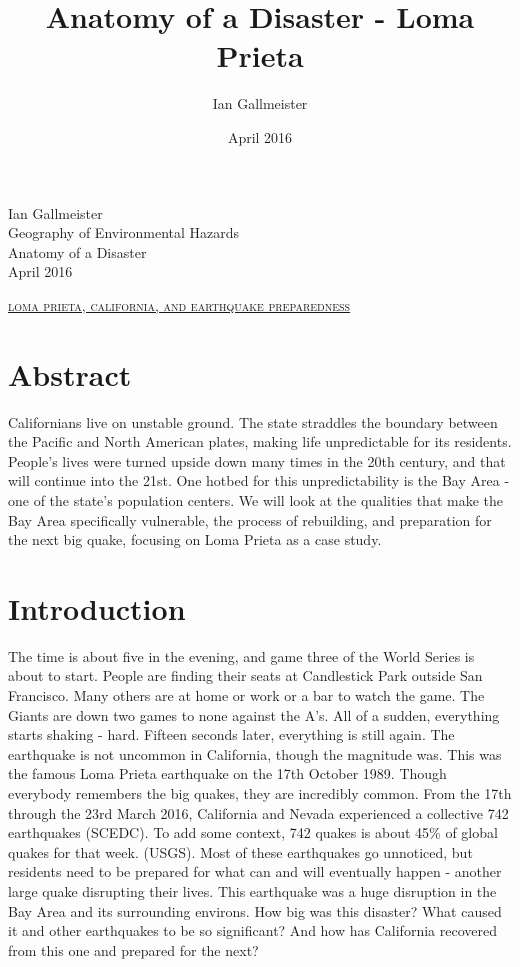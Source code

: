 \documentclass[12pt]{article}
\title{Anatomy of a Disaster - Loma Prieta}
\author{Ian Gallmeister}
\date{April 2016}
\begin{document}
\noindent Ian Gallmeister \\
Geography of Environmental Hazards \\
Anatomy of a Disaster \\
April 2016

\begin{center}
\large \textsc{\underline{loma prieta, california, and earthquake preparedness}} 
\end{center}

\vspace*{2em}

{\centering \section*{Abstract}}
Californians live on unstable ground.  The state straddles the boundary between the Pacific and North American plates, making life unpredictable for its residents.  People’s lives were turned upside down many times in the 20th century, and that will continue into the 21st.  One hotbed for this unpredictability is the Bay Area - one of the state’s population centers.  We will look at the qualities that make the Bay Area specifically vulnerable, the process of rebuilding, and preparation for the next big quake, focusing on Loma Prieta as a case study.

\vspace*{2em}

\section*{Introduction}
The time is about five in the evening, and game three of the World Series is about to start. People are finding their seats at Candlestick Park outside San Francisco.  Many others are at home or work or a bar to watch the game.  The Giants are down two games to none against the A's.  All of a sudden, everything starts shaking - hard.  Fifteen seconds later, everything is still again.  The earthquake is not uncommon in California, though the magnitude was.  This was the famous Loma Prieta earthquake on the 17th October 1989.  Though everybody remembers the big quakes, they are incredibly common.  From the 17th through the 23rd March 2016, California and Nevada experienced a collective 742 earthquakes (SCEDC).  To add some context, 742 quakes is about 45\% of global quakes for that week. (USGS).  Most of these earthquakes go unnoticed, but residents need to be prepared for what can and will eventually happen - another large quake disrupting their lives.  This earthquake was a huge disruption in the Bay Area and its surrounding environs.  How big was this disaster?  What caused it and other earthquakes to be so significant?  And how has California recovered from this one and prepared for the next?
\end{document}
